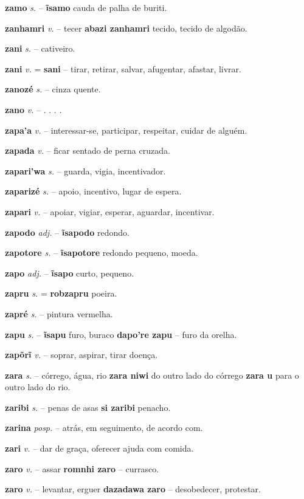 \textbf{zamo} \textit{s.} -- \textbf{ĩsamo} cauda de palha de buriti.

\textbf{zanhamri} \textit{v.} -- tecer  \textbf{abazi zanhamri} tecido, tecido de algodão.

\textbf{zani} \textit{s.} -- cativeiro.

\textbf{zani} \textit{v.} = \textbf{sani} -- tirar, retirar, salvar, afugentar, afastar, livrar.

\textbf{zanozé} \textit{s.} -- cinza quente.

\textbf{zano} \textit{v.} -- . . . .

\textbf{zapa'a} \textit{v.} -- interessar-se, participar, respeitar, cuidar de alguém.

\textbf{zapada} \textit{v.} -- ficar sentado de perna cruzada.

\textbf{zapari'wa} \textit{s.} -- guarda, vigia, incentivador.

\textbf{zaparizé} \textit{s.} -- apoio, incentivo, lugar de espera.

\textbf{zapari} \textit{v.} -- apoiar, vigiar, esperar, aguardar, incentivar.

\textbf{zapodo} \textit{adj.} -- \textbf{ĩsapodo} redondo.

\textbf{zapotore} \textit{s.} -- \textbf{ĩsapotore} redondo pequeno, moeda.

\textbf{zapo} \textit{adj.} -- \textbf{ĩsapo} curto, pequeno.

\textbf{zapru} \textit{s.} = \textbf{robzapru} poeira.

\textbf{zapré} \textit{s.} -- pintura vermelha.

\textbf{zapu} \textit{s.} -- \textbf{ĩsapu} furo, buraco  \textbf{dapo're zapu} -- furo da orelha.

\textbf{zapõrĩ} \textit{v.} -- soprar, aspirar, tirar doença.

\textbf{zara} \textit{s.} -- córrego, água, rio  \textbf{zara niwi} do outro lado do córrego  \textbf{zara u} para o outro lado do rio.

\textbf{zaribi} \textit{s.} -- penas de asas  \textbf{si zaribi} penacho.

\textbf{zarina} \textit{posp.} -- atrás, em seguimento, de acordo com.

\textbf{zari} \textit{v.} -- dar de graça, oferecer ajuda com comida.

\textbf{zaro} \textit{v.} -- assar  \textbf{romnhi zaro} -- currasco.

\textbf{zaro} \textit{v.} -- levantar, erguer  \textbf{dazadawa zaro} -- desobedecer, protestar.

